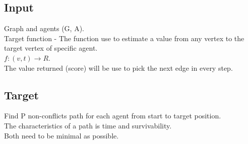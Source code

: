 \documentclass[]{article}
\begin{document}
\subsection{Input} 
Graph and agents (G, A).\\
Target function - The function use to estimate a value from any vertex to the target vertex of specific agent.\\
$f: (v, t) \rightarrow R$.\\
The value returned (score) will be use to pick the next edge in every step.
\subsection{Target} 
Find P non-conflicts path for each agent from start to target position.\\
The characteristics of a path is time and survivability.\\
Both need to be minimal as possible.
\end{document}
